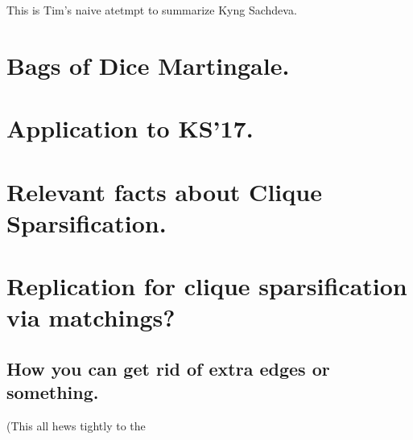 

This is Tim's naive atetmpt to summarize Kyng Sachdeva.
\section{Bags of Dice Martingale.}
\section{Application to KS'17.}
\section{Relevant facts about Clique Sparsification.}
\section{Replication for clique sparsification via matchings?}
\subsection{How you can get rid of extra edges or something.}
(This all hews tightly to the 


